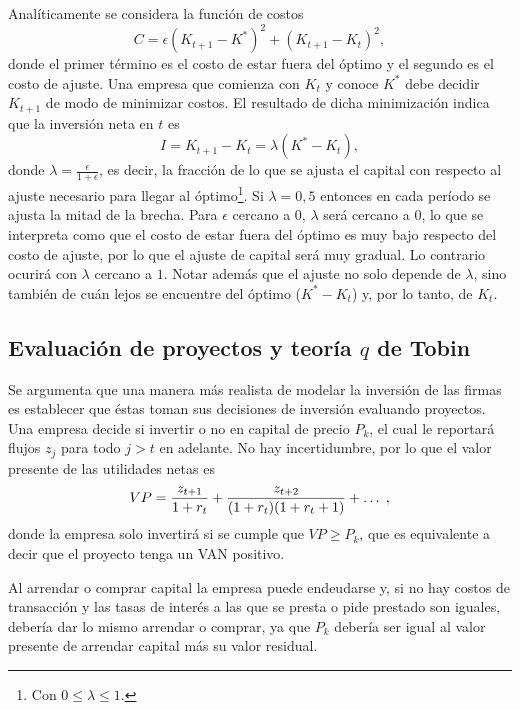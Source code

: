 \documentclass[DeGregorioResumen]{subfiles}
\begin{document}
Analíticamente se considera la función de costos
\begin{equation}
C= \epsilon ( K_{t+1}-K^*)^2+(K_{t+1}-K_t)^2,
\end{equation}
donde el primer término es el costo de estar fuera del óptimo y el segundo es el costo de ajuste. Una empresa que comienza con $K_t$ y conoce $K^*$ debe decidir $K_{t+1}$ de modo de minimizar costos. El resultado de dicha minimización indica que la inversión neta en $t$ es
\begin{equation}
I=K_{t+1}-K_t = \lambda(K^*-K_t),
\end{equation}
donde $\lambda=\frac{\epsilon}{1+\epsilon}$, es decir, la fracción de lo que se ajusta el capital con respecto al ajuste necesario para llegar al óptimo\footnote{Con $0\leq \lambda \leq 1$.}. Si $\lambda=0,5$ entonces en cada período se ajusta la mitad de la brecha. Para $\epsilon$ cercano a $0$, $\lambda$ será cercano a $0$, lo que se interpreta como que el costo de estar fuera del óptimo es muy bajo respecto del costo de ajuste, por lo que el ajuste de capital será muy gradual. Lo contrario ocurirá con $\lambda$ cercano a $1$. Notar además que el ajuste no solo depende de $\lambda$, sino también de cuán lejos se encuentre del óptimo ($K^*-K_t$) y, por lo tanto, de $K_t$.

\subsection{Evaluación de proyectos y teoría $q$ de Tobin}

Se argumenta que una manera más realista de modelar la inversión de las firmas es establecer que éstas toman sus decisiones de inversión evaluando proyectos. Una empresa decide si invertir o no en capital de precio $P_k$, el cual le reportará flujos $z_j$ para todo $j>t$ en adelante. No hay incertidumbre, por lo que el valor presente de las utilidades netas es
\begin{equation*}
VP=\frac{{z}_{t+1}}{1+r_t}+\frac{{z}_{t+2}}{(1+r_t)(1+r_t+1)}+\ldots \;,
\end{equation*}
donde la empresa solo invertirá si se cumple que $VP \geq P_k$, que es equivalente a decir que el proyecto tenga un VAN positivo.

Al arrendar o comprar capital la empresa puede endeudarse y, si no hay costos de transacción y las tasas de interés a las que se presta o pide prestado son iguales, debería dar lo mismo arrendar o comprar, ya que $P_k$ debería ser igual al valor presente de arrendar capital más su valor residual.
\end{document}
